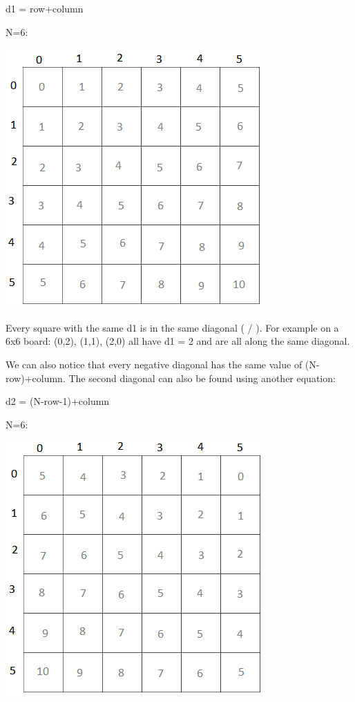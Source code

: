 \documentclass[11pt,oneside]{book}
\makeatletter
\def\maxwidth#1{\ifdim\Gin@nat@width>#1 #1\else\Gin@nat@width\fi}
\makeatother
\begin{document}
d1 = row+column

N=6:

\includegraphics[width=\maxwidth{\textwidth}]{nqueen1.png}

Every square with the same d1 is in the same diagonal ( / ). For example on a 6x6 board: (0,2), (1,1), (2,0) all have d1 = 2 and are all along the same diagonal.

We can also notice that every negative diagonal has the same value of (N-row)+column. The second diagonal can also be found using another equation:

d2 = (N-row-1)+column

N=6:

\includegraphics[width=\maxwidth{\textwidth}]{nqueen2.png}
\end{document}
